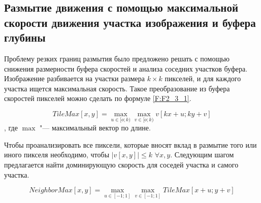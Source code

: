 \subsection{Размытие движения с помощью максимальной скорости движения участка изображения и буфера глубины}
\label{cha:analysis_mcgiure}

Проблему резких границ размытия было предложено решать с помощью снижения размерности буфера скоростей и анализа соседних участков буфера. Изображение разбивается на участки размера $k \times k$ пикселей, и для каждого участка ищется максимальная скорость. Такое преобразование из буфера скоростей пикселей можно сделать по формуле \eqref{F:F2_3_1}.
\begin{eqndesc}
    \begin{equation}\label{F:F2_3_1}
        TileMax[x,y] = \max_{u \in [o ; k)} {
        \max_{v \in [o ; k)} {v [kx + u; ky + v]}
        }
    \end{equation}
    , где $\max$ "--- максимальный вектор по длине.
\end{eqndesc}

Чтобы проанализировать все пиксели, которые вносят вклад в размытие того или иного пикселя необходимо, чтобы $|v[x,y]| \le k $ \space $\forall x,y $. Следующим шагом предлагается найти доминирующую скорость для соседей участка и самого участка.

\begin{eqndesc}
    \begin{equation}\label{F:F2_3_2}
        NeighborMax[x,y] = \max_{u \in [-1 ; 1]} {
            \max_{v \in [-1 ;1]} {TileMax [x + u; y + v]}
        }
    \end{equation}
\end{eqndesc}

